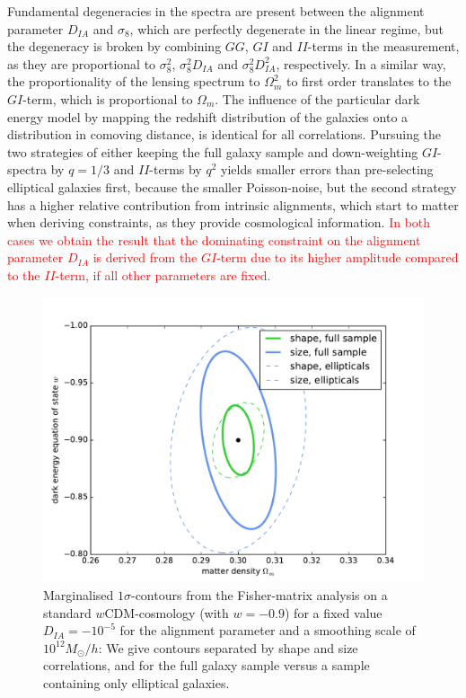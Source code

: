 \documentclass[a4paper,fleqn,usenatbib]{mnras}
\newcommand\BG[1]{\textcolor{red}{#1}}
\begin{document}
Fundamental degeneracies in the spectra are present between the alignment parameter $D_{IA}$ and $\sigma_8$, which are perfectly degenerate in the linear regime, but the degeneracy is broken by combining $GG$, $GI$ and $II$-terms in the measurement, as they are proportional to $\sigma_8^2$, $\sigma_8^2D_{IA}$ and $\sigma_8^2D_{IA}^2$, respectively. In a  similar way, the proportionality of the lensing spectrum to $\Omega_m^2$ to first order translates to the $GI$-term, which is proportional to $\Omega_m$. The influence of the particular dark energy model by mapping the redshift distribution of the galaxies onto a distribution in comoving distance, is identical for all correlations. Pursuing the two strategies of either keeping the full galaxy sample and down-weighting $GI$-spectra by $q=1/3$ and $II$-terms by $q^2$ yields smaller errors than pre-selecting elliptical galaxies first, because the smaller Poisson-noise, but the second strategy has a higher relative contribution from intrinsic alignments, which start to matter when deriving constraints, as they provide cosmological information. \BG{In both cases we obtain the result that the dominating constraint on the alignment parameter $D_{IA}$ is derived from the $GI$-term due to its higher amplitude compared to the $II$-term, if all other parameters are fixed.} 

\begin{figure}
\centering
\includegraphics[scale=0.45]{./figures/fisher.pdf}
\caption{Marginalised $1\sigma$-contours from the Fisher-matrix analysis on a standard $w$CDM-cosmology (with $w=-0.9$) for a fixed value $D_{IA}=-10^{-5}$ for the alignment parameter and a smoothing scale of $10^{12}M_\odot/h$: We give contours separated by shape and size correlations, and for the full galaxy sample versus a sample containing only elliptical galaxies.}
\label{fig:fisher}
\end{figure}
\end{document}

